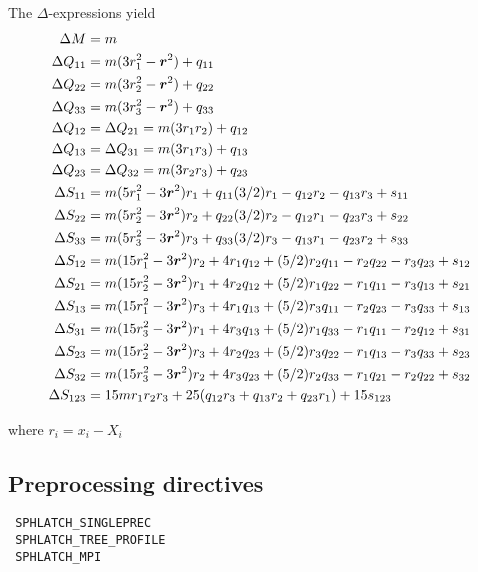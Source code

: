The $\Delta$-expressions yield
\begin{align*}
\Delta M &= m \\
\Delta Q_{11} &= m (3 r_1^2 - \boldsymbol{r}^2) + q_{11} \nonumber \\
\Delta Q_{22} &= m (3 r_2^2 - \boldsymbol{r}^2) + q_{22} \nonumber \\
\Delta Q_{33} &= m (3 r_3^2 - \boldsymbol{r}^2) + q_{33} \nonumber \\
\Delta Q_{12} &= \Delta Q_{21} = m ( 3 r_1 r_2 ) + q_{12} \nonumber \\
\Delta Q_{13} &= \Delta Q_{31} = m ( 3 r_1 r_3 ) + q_{13} \nonumber \\
\Delta Q_{23} &= \Delta Q_{32} = m ( 3 r_2 r_3 ) + q_{23} \nonumber \\
\Delta S_{11} &= m ( 5 r_1^2 - 3 \boldsymbol{r}^2 ) r_1 + q_{11} (3/2) r_1 - q_{12} r_2 - q_{13} r_3 + s_{11} \nonumber \\
\Delta S_{22} &= m ( 5 r_2^2 - 3 \boldsymbol{r}^2 ) r_2 + q_{22} (3/2) r_2 - q_{12} r_1 - q_{23} r_3 + s_{22} \nonumber \\
\Delta S_{33} &= m ( 5 r_3^2 - 3 \boldsymbol{r}^2 ) r_3 + q_{33} (3/2) r_3 - q_{13} r_1 - q_{23} r_2 + s_{33} \nonumber \\
\Delta S_{12} &= m ( 15 r_1^2 - 3 \boldsymbol{r}^2 ) r_2 + 4 r_1 q_{12} + (5/2) r_2 q_{11} - r_2 q_{22} - r_3 q_{23} + s_{12} \\
\Delta S_{21} &= m ( 15 r_2^2 - 3 \boldsymbol{r}^2 ) r_1 + 4 r_2 q_{12} + (5/2) r_1 q_{22} - r_1 q_{11} - r_3 q_{13} + s_{21} \\
\Delta S_{13} &= m ( 15 r_1^2 - 3 \boldsymbol{r}^2 ) r_3 + 4 r_1 q_{13} + (5/2) r_3 q_{11} - r_2 q_{23} - r_3 q_{33} + s_{13} \\
\Delta S_{31} &= m ( 15 r_3^2 - 3 \boldsymbol{r}^2 ) r_1 + 4 r_3 q_{13} + (5/2) r_1 q_{33} - r_1 q_{11} - r_2 q_{12} + s_{31} \\
\Delta S_{23} &= m ( 15 r_2^2 - 3 \boldsymbol{r}^2 ) r_3 + 4 r_2 q_{23} + (5/2) r_3 q_{22} - r_1 q_{13} - r_3 q_{33} + s_{23} \\
\Delta S_{32} &= m ( 15 r_3^2 - 3 \boldsymbol{r}^2 ) r_2 + 4 r_3 q_{23} + (5/2) r_2 q_{33} - r_1 q_{21} - r_2 q_{22} + s_{32} \\
\Delta S_{123} &=15 m r_1 r_2 r_3 + 25 ( q_{12}  r_3 + q_{13} r_2 + q_{23} r_1) + 15 s_{123} 
\end{align*}

where $r_i = x_i - X_i$

\subsection{Preprocessing directives}
\verb| SPHLATCH_SINGLEPREC | \\
\verb| SPHLATCH_TREE_PROFILE |\\
\verb| SPHLATCH_MPI |\\

